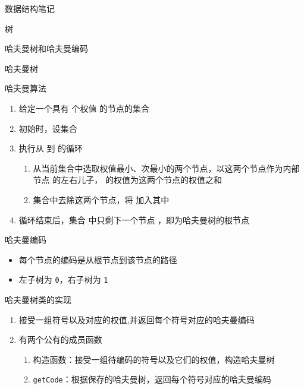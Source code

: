 \documentclass[
  ignorenonframetext,
]{beamer}
\providecommand{\tightlist}{%
  \setlength{\itemsep}{0pt}\setlength{\parskip}{0pt}}
\begin{document}
\begin{frame}[fragile]{数据结构笔记}
\begin{block}{树}
\begin{block}{哈夫曼树和哈夫曼编码}
\begin{block}{哈夫曼树}
\end{block}

\begin{block}{哈夫曼算法}
\protect{}\label{ux54c8ux592bux66fcux7b97ux6cd5}
\begin{enumerate}
\tightlist
\item
  给定一个具有 {} 个权值 {} 的节点的集合 {}\\
  {}
\item
  初始时，设集合 {}
\item
  执行从 {} 到 {} 的循环

  \begin{enumerate}
  \tightlist
  \item
    从当前集合中选取权值最小、次最小的两个节点，以这两个节点作为内部节点
    {} 的左右儿子，{} 的权值为这两个节点的权值之和
  \item
    集合中去除这两个节点，将 {} 加入其中
  \end{enumerate}
\item
  循环结束后，集合 {}中只剩下一个节点 {}，即为哈夫曼树的根节点
\end{enumerate}
\end{block}

\begin{block}{哈夫曼编码}
\protect{}\label{ux54c8ux592bux66fcux7f16ux7801}
\begin{itemize}
\tightlist
\item
  每个节点的编码是从根节点到该节点的路径
\item
  左子树为 \texttt{0}，右子树为 \texttt{1}
\end{itemize}
\end{block}

\begin{block}{哈夫曼树类的实现}
\protect{}\label{ux54c8ux592bux66fcux6811ux7c7bux7684ux5b9eux73b0}
\begin{enumerate}
\tightlist
\item
  接受一组符号以及对应的权值,并返回每个符号对应的哈夫曼编码
\item
  有两个公有的成员函数

  \begin{enumerate}
  \tightlist
  \item
    构造函数：接受一组待编码的符号以及它们的权值，构造哈夫曼树
  \item
    \texttt{getCode}：根据保存的哈夫曼树，返回每个符号对应的哈夫曼编码
  \end{enumerate}
\end{enumerate}


\end{block}
\end{block}
\end{block}
\end{frame}
\end{document}
